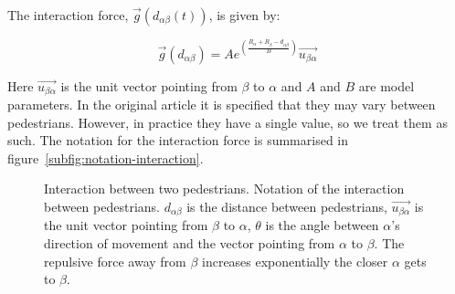 The interaction force, $\overrightarrow{g}\left(d_{\alpha \beta} (t)\right)$, is 
given by:  

\begin{equation}
    \overrightarrow{g} 
    \left(
        d_{\alpha \beta}
    \right)
    =
    A e^{ \left(
        \frac{ R_\alpha + R_\beta - d_{\alpha \beta}}
             {B}
    \right)}
    \overrightarrow{u_{\beta \alpha}}
    \label{re}	
\end{equation}

Here $\overrightarrow{u_{\beta \alpha}}$ is the unit vector pointing from 
$\beta$ to $\alpha$ and $A$ and $B$ are model parameters. In the original 
article it is specified that they may vary between pedestrians. However, in 
practice they have a single value, so we treat them as such. The notation for 
the interaction force is summarised in 
figure~\ref{subfig:notation-interaction}.

\begin{figure}[h]
    \centering
    \caption[Interaction between two pedestrians]{Interaction between two 
    pedestrians.  Notation of the 
    interaction between pedestrians. $d_{\alpha \beta}$ is the distance 
    between pedestrians, $\overrightarrow{u_{\beta \alpha}}$ is the unit 
    vector pointing from $\beta$ to $\alpha$, $\theta$ is the angle between 
    $\alpha$'s direction of movement and the vector pointing from $\alpha$ to 
    $\beta$.  The repulsive force away 
    from $\beta$ increases exponentially the closer $\alpha$ gets to $\beta$.}
    \label{fig:pedestrian-interaction}
\end{figure}

